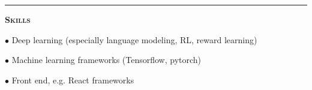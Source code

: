 \documentclass[11 pt]{article}
\begin{document}
\begin{comment}

\begin{center}\textbf{The Bishop's School, La Jolla, CA} \end{center} \vspace{-6 pt}

\textbf{Date of graduation}: May 2008, cum laude \hfill \textbf{GPA}: 4.66/5

\begin{small}

$\bullet$ National AP Scholar, 3$\times$ USAMO qualifier \hfill \textbf{ACT}: 34, \textbf{SAT}: 2230\\





\end{small}

\end{comment}
\hrule

\begin{center}\begin{Large}\textsc{\textbf{Skills}\\}\end{Large}\end{center}


$\bullet$ Deep learning (especially language modeling, RL, reward learning)

$\bullet$ Machine learning frameworks (Tensorflow, pytorch)

$\bullet$ Front end, e.g. React frameworks
\end{document}
